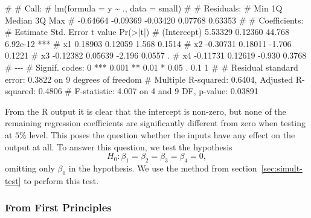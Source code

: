 \documentclass[
  a4paper,
]{article}
\newenvironment{Shaded}{\begin{snugshade}}{\end{snugshade}}
\newcommand{\NormalTok}[1]{#1}
\theoremstyle{definition}
\theoremstyle{definition}
\theoremstyle{definition}
\theoremstyle{definition}
\theoremstyle{remark}
\begin{document}
\begin{Shaded}
\begin{Highlighting}[]
\NormalTok{\# }
\NormalTok{\# Call:}
\NormalTok{\# lm(formula = y \textasciitilde{} ., data = small)}
\NormalTok{\# }
\NormalTok{\# Residuals:}
\NormalTok{\#      Min       1Q   Median       3Q      Max }
\NormalTok{\# {-}0.64664 {-}0.09369 {-}0.03420  0.07768  0.63353 }
\NormalTok{\# }
\NormalTok{\# Coefficients:}
\NormalTok{\#             Estimate Std. Error t value Pr(\textgreater{}|t|)    }
\NormalTok{\# (Intercept)  5.53329    0.12360  44.768 6.92e{-}12 ***}
\NormalTok{\# x1           0.18903    0.12059   1.568   0.1514    }
\NormalTok{\# x2          {-}0.30731    0.18011  {-}1.706   0.1221    }
\NormalTok{\# x3          {-}0.12382    0.05639  {-}2.196   0.0557 .  }
\NormalTok{\# x4          {-}0.11731    0.12619  {-}0.930   0.3768    }
\NormalTok{\# {-}{-}{-}}
\NormalTok{\# Signif. codes:  0 \textquotesingle{}***\textquotesingle{} 0.001 \textquotesingle{}**\textquotesingle{} 0.01 \textquotesingle{}*\textquotesingle{} 0.05 \textquotesingle{}.\textquotesingle{} 0.1 \textquotesingle{} \textquotesingle{} 1}
\NormalTok{\# }
\NormalTok{\# Residual standard error: 0.3822 on 9 degrees of freedom}
\NormalTok{\# Multiple R{-}squared:  0.6404,  Adjusted R{-}squared:  0.4806 }
\NormalTok{\# F{-}statistic: 4.007 on 4 and 9 DF,  p{-}value: 0.03891}
\end{Highlighting}
\end{Shaded}

From the R output it is clear that the intercept is non-zero,
but none of the remaining regression coefficients are significantly
different from zero when testing at \(5\%\) level. This poses the question
whether the inputs have any effect on the output at all.
To answer this question, we test the hypothesis
\begin{equation*}
  H_0\colon \beta_1 = \beta_2 = \beta_3 = \beta_4 = 0,
\end{equation*}
omitting only \(\beta_0\) in the hypothesis. We use the method from
section~\ref{sec:simult-test} to perform this test.

\hypertarget{from-first-principles-2}{%
\subsubsection{From First Principles}\label{from-first-principles-2}}
\end{document}
